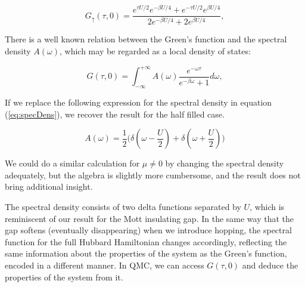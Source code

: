 \begin{equation}
G_\uparrow (\tau, 0) = \frac{ e^{\tau U / 2} e^{-\beta U / 4} + e^{-\tau U / 2} e^{\beta U / 4 } }{ 2 e^{-\beta U / 4}  + 2 e^{\beta U / 4} } ,
\end{equation}

There is a well known relation between the Green's function and the spectral density $A ( \omega )$, which may be regarded as a local density of states:

\begin{equation}\label{eq:specDens}
G ( \tau, 0 ) =  \int_{-\infty}^{+\infty} A ( \omega ) \frac{e^{-\omega \tau} }{ e^{-\beta \omega} + 1 } d\omega ,
\end{equation}

If we replace the following expression for the spectral density in equation (\ref{eq:specDens}), we recover the result for the half filled case.

\begin{equation}
A ( \omega ) = \frac{1}{2} \bigg( \delta ( \omega - \frac{U}{2} ) + \delta ( \omega + \frac{U}{2} ) \bigg)
\end{equation}

We could do a similar calculation for $\mu \neq 0$ by changing the spectral density adequately, but the algebra is slightly more cumbersome, and the result does not bring additional insight.

The spectral density consists of two delta functions separated by $U$, which is reminiscent of our result for the Mott insulating gap.
In the same way that the gap softens (eventually disappearing) when we introduce hopping, the spectral function for the full Hubbard Hamiltonian changes accordingly, reflecting the same information about the properties of the system as the Green's function, encoded in a different manner.
In \acs{QMC}, we can access $G(\tau, 0)$ and deduce the properties of the system from it.